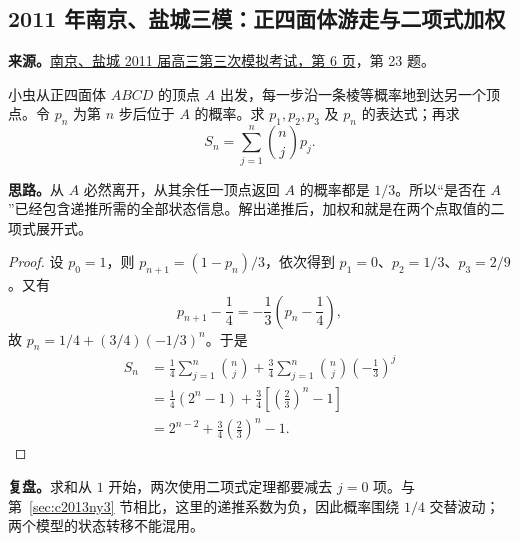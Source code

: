 \documentclass[UTF8,12pt,a4paper,fontset=fandol]{ctexart}
\begin{document}
\subsection{2011 年南京、盐城三模：正四面体游走与二项式加权}\label{sec:c2011ny3}
\textbf{来源。}\href{https://doc.xuehai.net/b699d388c622547cec887cbae-6.html}{南京、盐城 2011 届高三第三次模拟考试，第 6 页}，第 23 题。
\begin{example}[题意]
小虫从正四面体 $ABCD$ 的顶点 $A$ 出发，每一步沿一条棱等概率地到达另一个顶点。令 $p_n$ 为第 $n$ 步后位于 $A$ 的概率。求 $p_1,p_2,p_3$ 及 $p_n$ 的表达式；再求
\[
S_n=\sum_{j=1}^{n}\binom njp_j.
\]
\end{example}
\textbf{思路。}从 $A$ 必然离开，从其余任一顶点返回 $A$ 的概率都是 $1/3$。所以“是否在 $A$”已经包含递推所需的全部状态信息。解出递推后，加权和就是在两个点取值的二项式展开式。
\begin{proof}
设 $p_0=1$，则 $p_{n+1}=(1-p_n)/3$，依次得到 $p_1=0$、$p_2=1/3$、$p_3=2/9$。又有
\[
p_{n+1}-\frac14=-\frac13\left(p_n-\frac14\right),
\]
故 $p_n=1/4+(3/4)(-1/3)^n$。于是
\begin{align*}
S_n
&=\frac14\sum_{j=1}^{n}\binom nj
 +\frac34\sum_{j=1}^{n}\binom nj\left(-\frac13\right)^j\\
&=\frac14(2^n-1)+\frac34\left[\left(\frac23\right)^n-1\right]\\
&=\boxed{2^{n-2}+\frac34\left(\frac23\right)^n-1}.
\end{align*}
\end{proof}
\textbf{复盘。}求和从 $1$ 开始，两次使用二项式定理都要减去 $j=0$ 项。与第~\ref{sec:c2013ny3} 节相比，这里的递推系数为负，因此概率围绕 $1/4$ 交替波动；两个模型的状态转移不能混用。
\end{document}
